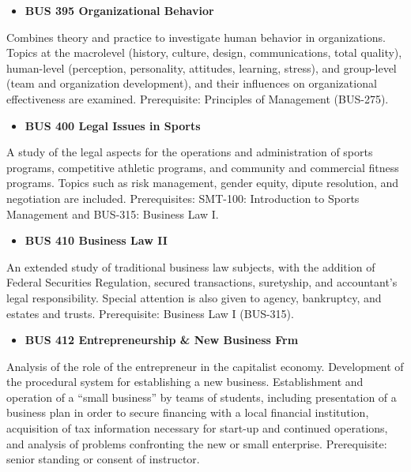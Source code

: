 \documentclass[
  letterpaper,
]{scrbook}
\providecommand{\tightlist}{%
  \setlength{\itemsep}{0pt}\setlength{\parskip}{0pt}}
\begin{document}
\begin{itemize}
\tightlist
\item
  \textbf{BUS 395 Organizational Behavior}
\end{itemize}

Combines theory and practice to investigate human behavior in
organizations. Topics at the macrolevel (history, culture, design,
communications, total quality), human-level (perception, personality,
attitudes, learning, stress), and group-level (team and organization
development), and their influences on organizational effectiveness are
examined. Prerequisite: Principles of Management (BUS-275).

\begin{itemize}
\tightlist
\item
  \textbf{BUS 400 Legal Issues in Sports}
\end{itemize}

A study of the legal aspects for the operations and administration of
sports programs, competitive athletic programs, and community and
commercial fitness programs. Topics such as risk management, gender
equity, dipute resolution, and negotiation are included. Prerequisites:
SMT-100: Introduction to Sports Management and BUS-315: Business Law I.

\begin{itemize}
\tightlist
\item
  \textbf{BUS 410 Business Law II}
\end{itemize}

An extended study of traditional business law subjects, with the
addition of Federal Securities Regulation, secured transactions,
suretyship, and accountant's legal responsibility. Special attention is
also given to agency, bankruptcy, and estates and trusts. Prerequisite:
Business Law I (BUS-315).

\begin{itemize}
\tightlist
\item
  \textbf{BUS 412 Entrepreneurship \& New Business Frm}
\end{itemize}

Analysis of the role of the entrepreneur in the capitalist economy.
Development of the procedural system for establishing a new business.
Establishment and operation of a ``small business'' by teams of
students, including presentation of a business plan in order to secure
financing with a local financial institution, acquisition of tax
information necessary for start-up and continued operations, and
analysis of problems confronting the new or small enterprise.
Prerequisite: senior standing or consent of instructor.
\end{document}
